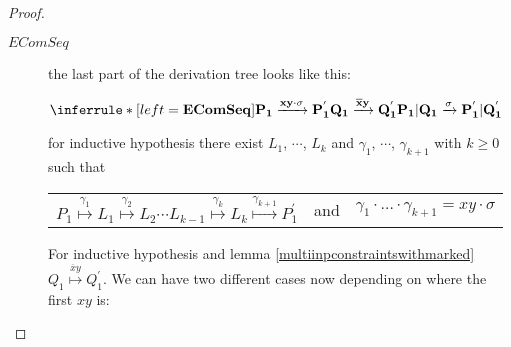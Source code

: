 \begin{proposition}
\begin{proof}
\begin{description}
      \item[$EComSeq$] 
	the last part of the derivation tree looks like this:
	\begin{center}
	  $\inferrule* [left=\bf{EComSeq}]{
	      P_{1} \xrightarrow{xy \cdot \sigma} P_{1}^{'}
	    \\
	      Q_{1} \xrightarrow{\overline{x}y} Q_{1}^{'}
	  }{
	    P_{1}|Q_{1} \xrightarrow{\sigma} P_{1}^{'}|Q_{1}^{'}
	  }$
	\end{center}
	for inductive hypothesis there exist $L_{1}$, $\cdots$, $L_{k}$ and $\gamma_{1}$, $\cdots$, $\gamma_{k+1}$ with $k\geq 0$ such that 
	\begin{center}
	  \begin{tabular}{lll}
	    $P_{1} \stackrel{\gamma_{1}}{\longmapsto} L_{1}  \stackrel{\gamma_{2}}{\longmapsto} L_{2} \cdots L_{k-1} \stackrel{\gamma_{k}}{\longmapsto} L_{k} \stackrel{\gamma_{k+1}}{\longmapsto} P_{1}^{'}$ 
	  &
	    and
	  &
	    $\gamma_{1} \cdot \ldots \cdot \gamma_{k+1} = xy \cdot \sigma$  
	  \end{tabular}
	\end{center}
	For inductive hypothesis and lemma \ref{multiinpconstraintswithmarked} $Q_{1} \stackrel{\overline{x}y}{\longmapsto} Q_{1}^{'}$. We can have two different cases now depending on where the first $xy$ is:
\end{description}
\end{proof}
\end{proposition}
